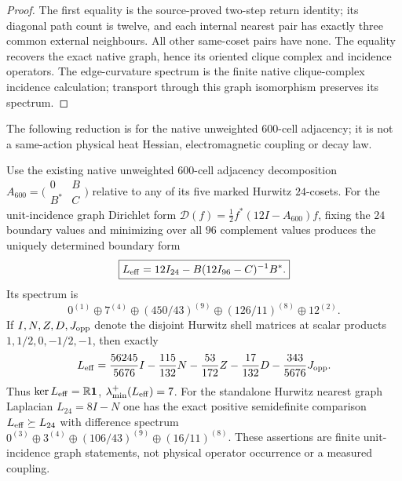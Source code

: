 \documentclass[11pt]{article}
\begin{document}
\begin{proof}
The first equality is the source-proved two-step return identity;
its diagonal path count is twelve, and each internal nearest pair has
exactly three common external neighbours. All other same-coset pairs
have none. The equality recovers the exact native graph, hence its
oriented clique complex and incidence operators. The edge-curvature
spectrum is the finite native clique-complex incidence calculation;
transport through this graph isomorphism preserves its spectrum.
\end{proof}

The following reduction is for the native unweighted $600$-cell adjacency;
it is not a same-action physical heat Hessian, electromagnetic coupling or
decay law.
\begin{theorem}
\label{p1b:thm:graph-kron-600-hurwitz}
Use the existing native unweighted $600$-cell adjacency decomposition
$A_{600}=\bigl(\begin{smallmatrix}0&B\\B^*&C\end{smallmatrix}\bigr)$
relative to any of its five marked Hurwitz $24$-cosets. For the
unit-incidence graph Dirichlet form $\mathscr D(f)=\tfrac12f^*(12I-A_{600})f$,
fixing the $24$ boundary values and minimizing over all $96$ complement
values produces the uniquely determined boundary form
\[
 \boxed{L_{\rm eff}=12I_{24}-B(12I_{96}-C)^{-1}B^*.}
\]
Its spectrum is
\[
 \boxed{0^{(1)}\oplus7^{(4)}\oplus(450/43)^{(9)}
        \oplus(126/11)^{(8)}\oplus12^{(2)}.}
\]
If $I,N,Z,D,J_{\rm opp}$ denote the disjoint Hurwitz shell matrices
at scalar products $1,1/2,0,-1/2,-1$, then exactly
\[
 L_{\rm eff}=\frac{56245}{5676}I-\frac{115}{132}N
 -\frac{53}{172}Z-\frac{17}{132}D-\frac{343}{5676}J_{\rm opp}.
\]
Thus $\ker L_{\rm eff}=\mathbb R\mathbf1$,
$\lambda_{\min}^{+}(L_{\rm eff})=7$.  For the standalone Hurwitz
nearest graph Laplacian $L_{24}=8I-N$ one has the exact positive
semidefinite comparison $L_{\rm eff}\succeq L_{24}$ with difference spectrum
$0^{(3)}\oplus3^{(4)}\oplus(106/43)^{(9)}\oplus(16/11)^{(8)}$.
These assertions are finite unit-incidence graph statements, not physical
operator occurrence or a measured coupling.
\end{theorem}
\end{document}
